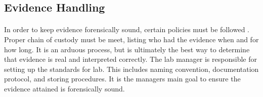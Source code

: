 \documentclass[12pt]{article}
\begin{document}
\subsection{Evidence Handling}
\paragraph{}
In order to keep evidence forensically sound, certain policies must be followed \cite{hayes}. 
Proper chain of custody must be meet, listing who had the evidence when and for how long.  
It is an arduous process, but is ultimately the best way to determine that evidence is real and interpreted correctly.
The lab manager is responsible for setting up the standards for lab.
This includes naming convention, documentation protocol, and storing procedures.
It is the managers main goal to ensure the evidence attained is forensically sound.

\newpage
\printbibliography
\end{document}
